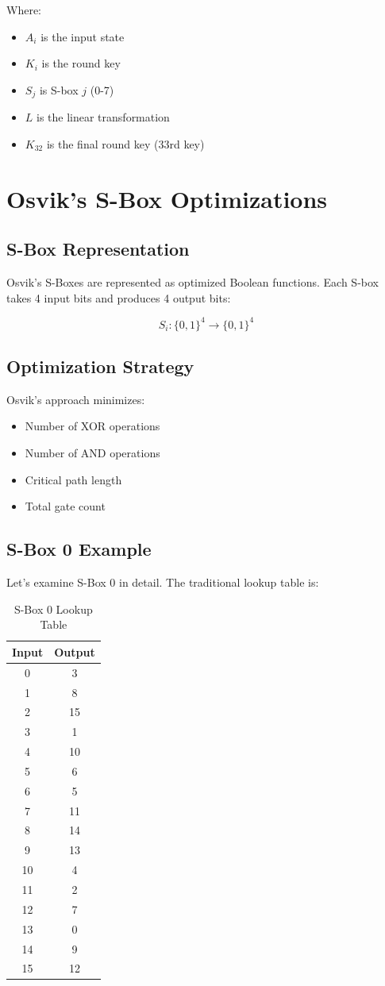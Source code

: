 \documentclass[12pt,a4paper]{article}
\begin{document}
Where:
\begin{itemize}
    \item $A_i$ is the input state
    \item $K_i$ is the round key
    \item $S_j$ is S-box $j$ (0-7)
    \item $L$ is the linear transformation
    \item $K_{32}$ is the final round key (33rd key)
\end{itemize}

\section{Osvik's S-Box Optimizations}

\subsection{S-Box Representation}
Osvik's S-Boxes are represented as optimized Boolean functions. Each S-box takes 4 input bits and produces 4 output bits:

$$S_i: \{0,1\}^4 \rightarrow \{0,1\}^4$$

\subsection{Optimization Strategy}
Osvik's approach minimizes:
\begin{itemize}
    \item Number of XOR operations
    \item Number of AND operations
    \item Critical path length
    \item Total gate count
\end{itemize}

\subsection{S-Box 0 Example}
Let's examine S-Box 0 in detail. The traditional lookup table is:

\begin{table}[H]
\centering
\begin{tabular}{|c|c|}
\hline
Input & Output \\
\hline
0 & 3 \\
1 & 8 \\
2 & 15 \\
3 & 1 \\
4 & 10 \\
5 & 6 \\
6 & 5 \\
7 & 11 \\
8 & 14 \\
9 & 13 \\
10 & 4 \\
11 & 2 \\
12 & 7 \\
13 & 0 \\
14 & 9 \\
15 & 12 \\
\hline
\end{tabular}
\caption{S-Box 0 Lookup Table}
\end{table}
\end{document}
